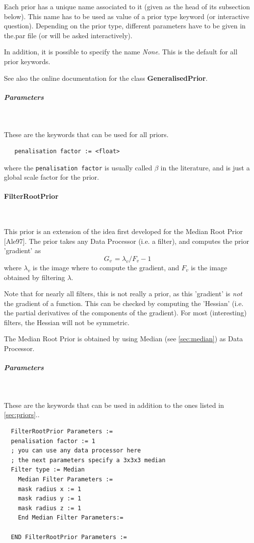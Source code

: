\documentclass{article}
\newcommand{\subsubsubsection}[1]{\paragraph{#1}\mbox{} \\}
\newcommand{\subsubsubsubsection}[1]{\subparagraph{#1} \mbox{} \\}
\begin{document}
{{Each prior has a unique name associated to it (given as the head 
of its subsection below). This name has to be used as value of 
a prior type keyword (or interactive question). Depending on 
the prior type, different parameters have to be given in the.par 
file (or will be asked interactively).


In addition, it is possible to specify the name \textit{None}. This 
is the default for all prior keywords.


See also the online documentation for the class \textbf{GeneralisedPrior}.


{ \subsubsubsubsection{Parameters}
}
These are the keywords that can be used for all priors.
  \begin{verbatim}
   penalisation factor := <float>
  \end{verbatim}
  \noindent where the \texttt{penalisation factor} is usually called
  $\beta$ in the literature, and is just a global scale factor for the
  prior.

{ \subsubsubsection{FilterRootPrior}
}
This prior is an extension of the idea first developed for the 
Median Root Prior [Ale97]. The prior takes any Data Processor 
(i.e. a filter), and computes the prior 'gradient' as 
\[
G_{v\,} =\lambda _{v} /F_{v}  -1
\]
\noindent where 
$\lambda _{v} $
 is the image where to compute the gradient, and 
$F_{v} $ is the image obtained by filtering $\lambda $.

Note that for nearly all filters, this is not really a prior, as 
this 'gradient' is \textit{not} the gradient of a function. This can 
be checked by computing the 'Hessian' (i.e. the partial derivatives 
of the components of the gradient). For most (interesting) filters, 
the Hessian will not be symmetric.


The Median Root Prior is obtained by using Median (see \ref{sec:median}) 
as Data Processor.

{ \subsubsubsubsection{Parameters}
}
These are the keywords that can be used in addition to the ones listed in \ref{sec:priors}..
  \begin{verbatim}
  FilterRootPrior Parameters :=
  penalisation factor := 1
  ; you can use any data processor here
  ; the next parameters specify a 3x3x3 median
  Filter type := Median
    Median Filter Parameters :=
    mask radius x := 1   
    mask radius y := 1
    mask radius z := 1
    End Median Filter Parameters:=

  END FilterRootPrior Parameters :=
 \end{verbatim}


}}
\end{document}
